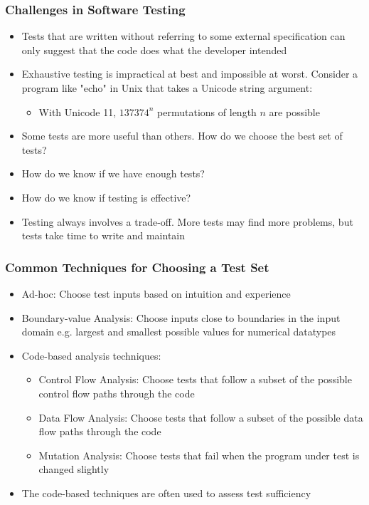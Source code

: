 \documentclass{beamer}
\begin{document}
\begin{frame}
\frametitle{Challenges in Software Testing}
\begin{itemize}
	\item Tests that are written without referring to some external specification can only suggest that the code does what the developer intended
	\item Exhaustive testing is impractical at best and impossible at worst. Consider a program like "echo" in Unix that takes a Unicode string argument:
	\begin{itemize}
		\item With Unicode 11, $137374^n$ permutations of length $n$ are possible\cite{unicodestd}
	\end{itemize}
	\item Some tests are more useful than others. How do we choose the best set of tests?
	\item How do we know if we have enough tests?
	\item How do we know if testing is effective?
	\item Testing always involves a trade-off. More tests may find more problems, but tests take time to write and maintain
\end{itemize}
\end{frame}

\begin{frame}
\frametitle{Common Techniques for Choosing a Test Set}
\begin{itemize} 
	\item Ad-hoc: Choose test inputs based on intuition and experience
	\item Boundary-value Analysis: Choose inputs close to boundaries in the input domain e.g. largest and smallest possible values for numerical datatypes
	\item Code-based analysis techniques:
	\begin{itemize}
		\item Control Flow Analysis: Choose tests that follow a subset of the possible control flow paths through the code
		\item Data Flow Analysis: Choose tests that follow a subset of the possible data flow paths through the code
		\item Mutation Analysis: Choose tests that fail when the program under test is changed slightly
	\end{itemize}
	\item The code-based techniques are often used to assess test sufficiency
\end{itemize}
\end{frame}
\end{document}
